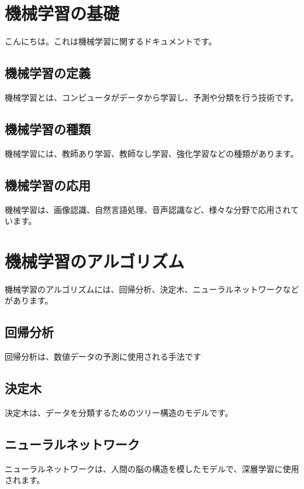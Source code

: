 \documentclass{ltjsarticle}      %
\begin{document}
\section{機械学習の基礎}
 こんにちは。これは機械学習に関するドキュメントです。
\subsection{機械学習の定義}
 機械学習とは、コンピュータがデータから学習し、予測や分類を行う技術です。
\subsection{機械学習の種類}
 機械学習には、教師あり学習、教師なし学習、強化学習などの種類があります。
\subsection{機械学習の応用}
 機械学習は、画像認識、自然言語処理、音声認識など、様々な分野で応用されています。
\section{機械学習のアルゴリズム}
 機械学習のアルゴリズムには、回帰分析、決定木、ニューラルネットワークなどがあります。
\subsection{回帰分析}
 回帰分析は、数値データの予測に使用される手法です
\subsection{決定木}
 決定木は、データを分類するためのツリー構造のモデルです。
\subsection{ニューラルネットワーク}
 ニューラルネットワークは、人間の脳の構造を模したモデルで、深層学習に使用されます。
\end{document}

